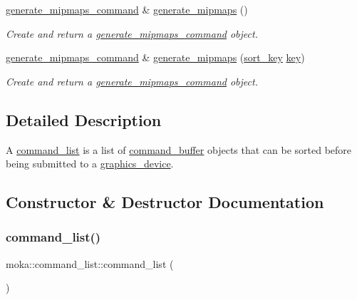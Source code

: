 \begin{DoxyCompactItemize}
\mbox{\hyperlink{classmoka_1_1generate__mipmaps__command}{generate\+\_\+mipmaps\+\_\+command}} \& \mbox{\hyperlink{classmoka_1_1command__list_a5248fda12caf3d68ac2803ccfaa3a4f7}{generate\+\_\+mipmaps}} ()
\begin{DoxyCompactList}\small\item\em Create and return a \mbox{\hyperlink{classmoka_1_1generate__mipmaps__command}{generate\+\_\+mipmaps\+\_\+command}} object. \end{DoxyCompactList}\item 
\mbox{\hyperlink{classmoka_1_1generate__mipmaps__command}{generate\+\_\+mipmaps\+\_\+command}} \& \mbox{\hyperlink{classmoka_1_1command__list_ae7230caa096de9359efba24b439c6558}{generate\+\_\+mipmaps}} (\mbox{\hyperlink{namespacemoka_afa30a616e67b83113ebdb857555cf2bb}{sort\+\_\+key}} \mbox{\hyperlink{namespacemoka_a45a36b05a9b9eddb028d6c60305ae71d}{key}})
\begin{DoxyCompactList}\small\item\em Create and return a \mbox{\hyperlink{classmoka_1_1generate__mipmaps__command}{generate\+\_\+mipmaps\+\_\+command}} object. \end{DoxyCompactList}\end{DoxyCompactItemize}


\subsection{Detailed Description}
A \mbox{\hyperlink{classmoka_1_1command__list}{command\+\_\+list}} is a list of \mbox{\hyperlink{classmoka_1_1command__buffer}{command\+\_\+buffer}} objects that can be sorted before being submitted to a \mbox{\hyperlink{classmoka_1_1graphics__device}{graphics\+\_\+device}}. 

\subsection{Constructor \& Destructor Documentation}
\mbox{\label{classmoka_1_1command__list_af4eee376414e5faef7e447035a382317}} 
\subsubsection{\texorpdfstring{command\_list()}{command\_list()}\hspace{0.1cm}{\footnotesize\ttfamily [1/3]}}
{\footnotesize\ttfamily moka\+::command\+\_\+list\+::command\+\_\+list (\begin{DoxyParamCaption}{ }\end{DoxyParamCaption})}

